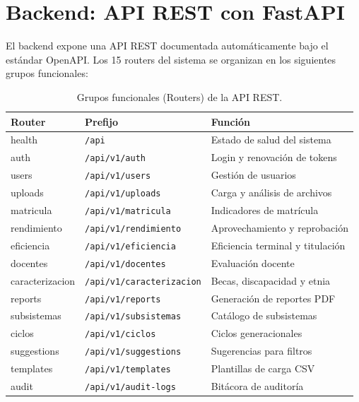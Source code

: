\section{Backend: API REST con FastAPI}

El backend expone una API REST documentada automáticamente bajo el estándar OpenAPI. Los 15 routers del sistema se organizan en los siguientes grupos funcionales:

\begin{table}[H]
\centering
\begin{tabular}{|l|l|l|}
\hline
\textbf{Router} & \textbf{Prefijo} & \textbf{Función} \\
\hline
health & \texttt{/api} & Estado de salud del sistema \\
auth & \texttt{/api/v1/auth} & Login y renovación de tokens \\
users & \texttt{/api/v1/users} & Gestión de usuarios \\
uploads & \texttt{/api/v1/uploads} & Carga y análisis de archivos \\
matricula & \texttt{/api/v1/matricula} & Indicadores de matrícula \\
rendimiento & \texttt{/api/v1/rendimiento} & Aprovechamiento y reprobación \\
eficiencia & \texttt{/api/v1/eficiencia} & Eficiencia terminal y titulación \\
docentes & \texttt{/api/v1/docentes} & Evaluación docente \\
caracterizacion & \texttt{/api/v1/caracterizacion} & Becas, discapacidad y etnia \\
reports & \texttt{/api/v1/reports} & Generación de reportes PDF \\
subsistemas & \texttt{/api/v1/subsistemas} & Catálogo de subsistemas \\
ciclos & \texttt{/api/v1/ciclos} & Ciclos generacionales \\
suggestions & \texttt{/api/v1/suggestions} & Sugerencias para filtros \\
templates & \texttt{/api/v1/templates} & Plantillas de carga CSV \\
audit & \texttt{/api/v1/audit-logs} & Bitácora de auditoría \\
\hline
\end{tabular}
\caption{Grupos funcionales (Routers) de la API REST.}
\end{table}

